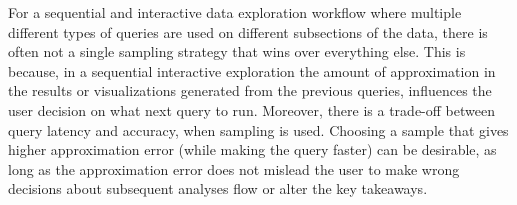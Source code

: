 For a sequential and interactive data exploration workflow where multiple different types of queries are used on different subsections of the data, there is often not a single sampling strategy that wins over everything else. This is because, in a sequential interactive exploration the amount of approximation in the results or visualizations generated from the previous queries, influences the user decision on what next query to run. 
Moreover, there is a trade-off between query latency and accuracy, when sampling is used.
Choosing a sample that gives higher approximation error (while making the query faster) can be desirable, as long as the approximation error does not mislead the user to make wrong decisions about subsequent analyses flow or alter the key takeaways.  

